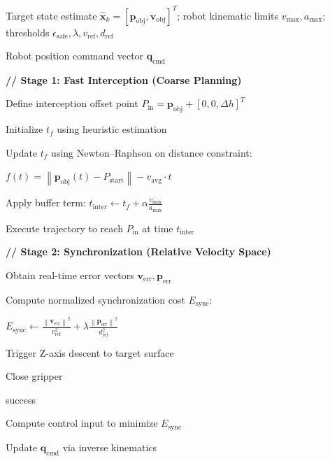 \begin{algorithm}[t]
\caption{Two-Stage Dynamic Grasping Planning Strategy}
\label{algo:two_stage_dynamic_grasping}
\begin{algorithmic}[1]

\Require Target state estimate
$\hat{\mathbf{x}}_k=
[\mathbf{p}_{\text{obj}},\mathbf{v}_{\text{obj}}]^{T}$;
robot kinematic limits $v_{\text{max}},a_{\text{max}}$;
thresholds $\epsilon_{\text{safe}},\lambda,v_{\text{ref}},d_{\text{ref}}$

\Ensure Robot position command vector $\mathbf{q}_{\text{cmd}}$

\State \textbf{// Stage 1: Fast Interception (Coarse Planning)}

\State Define interception offset point
$P_{\text{in}}=\mathbf{p}_{\text{obj}}+[0,0,\Delta h]^{T}$

\State Initialize $t_f$ using heuristic estimation

\Repeat

    \State Update $t_f$ using Newton--Raphson on distance constraint:

    \State
    $f(t)=
    \left\|
    \mathbf{p}_{\text{obj}}(t)-P_{\text{start}}
    \right\|
    -
    v_{\text{avg}}\cdot t$


\State Apply buffer term:
$t_{\text{inter}}\gets t_f+\alpha\frac{v_{\text{max}}}{a_{\text{max}}}$

\State Execute trajectory to reach $P_{\text{in}}$ at time $t_{\text{inter}}$

\State \textbf{// Stage 2: Synchronization (Relative Velocity Space)}


    \State Obtain real-time error vectors
    $\mathbf{v}_{\text{err}},\mathbf{p}_{\text{err}}$

    \State Compute normalized synchronization cost $E_{\text{sync}}$:

    \State
    $E_{\text{sync}}
    \gets
    \frac{\left\|\mathbf{v}_{\text{err}}\right\|^2}{v_{\text{ref}}^{2}}
    +
    \lambda
    \frac{\left\|\mathbf{p}_{\text{err}}\right\|^2}{d_{\text{ref}}^{2}}$


        \State Trigger Z-axis descent to target surface

        \State Close gripper

        \State \Return success

    \Else

        \State Compute control input to minimize $E_{\text{sync}}$

        \State Update $\mathbf{q}_{\text{cmd}}$ via inverse kinematics

    \EndIf

\EndWhile

\end{algorithmic}
\end{algorithm}

